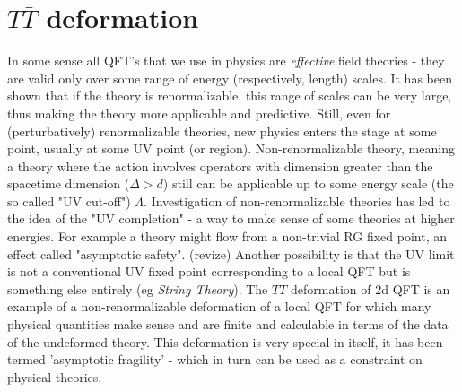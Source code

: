 \section{$T\bar{T}$ deformation}
In some sense all QFT's that we use in physics are \textit{effective} field
theories - they are valid only over some range of energy (respectively, length)
scales. It has been shown that if the theory is renormalizable, this range of
scales can be very large, thus making the theory more applicable and
predictive. Still, even for (perturbatively) renormalizable theories, new
physics enters the stage at some point, usually at some UV point (or region).
Non-renormalizable theory, meaning a theory where the  action involves 
operators with dimension greater than the spacetime dimension ($\Delta > d$)
still can be applicable up to some energy scale (the so called "UV cut-off")
$\Lambda$.
Investigation of non-renormalizable theories has led to the idea of the "UV
completion" - a way to make sense of some theories at higher energies. For
example a theory might flow from a non-trivial RG fixed point, an effect
called "asymptotic safety". (revize) Another possibility is that the UV limit
is not a conventional UV fixed point corresponding to a local QFT but is
something else entirely (eg \textit{String Theory}). The $T\bar{T}$ deformation
of 2d QFT is an example of a non-renormalizable deformation of a local QFT for
which many physical quantities make sense and are finite and calculable in
terms of the data of the undeformed theory. This deformation is very special in
itself, it has been termed 'asymptotic fragility' - which in turn can be used
as a constraint on physical theories.


